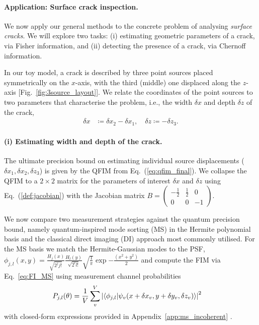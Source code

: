 \documentclass[reprint,amsmath,amssymb,aps,prl,floatfix,groupedaddress,superscriptaddress]{revtex4-2}
\begin{document}
\paragraph{\bfseries Application: Surface crack inspection.\label{sec:3src}}
We now apply our general methods to the concrete problem of analysing {\em surface cracks}. We will explore two tasks: (i) estimating geometric parameters of a crack, via Fisher information, and (ii) detecting the presence of a crack, via Chernoff information.

In our toy model, a crack is described by three point sources placed symmetrically on the $x$-axis, with the third (middle) one displaced along the $z$-axis [Fig.~\ref{fig:3source_layout}]. We relate the coordinates of the point sources to two parameters that characterise the problem, i.e., the width $\delta x$ and depth $\delta z$ of the crack,
\begin{equation}
\begin{aligned}
    \delta x &\coloneqq {\delta x_2 - \delta x_1}, \quad     \delta z \coloneqq -\delta z_3.
\end{aligned}
\label{eq:3pt2paramcoords}
\end{equation}

\paragraph{(i) Estimating width and depth of the crack.}
The ultimate precision bound on estimating individual source displacements (${\delta x_1},{\delta x_2},{\delta z_3}$) is given by the QFIM from Eq.~(\ref{eq:qfim_final}). We collapse the QFIM to a $2 \times 2$ matrix for the parameters of interest $\delta x$ and $\delta z$  using Eq.~(\ref{def:jacobian}) with the Jacobian matrix $B = \left(\begin{smallmatrix}
    -\frac{1}{2} & \frac{1}{2} &  0\\
    0 &  0 & -1
    \end{smallmatrix}\right)$.

We now compare two measurement strategies against the quantum precision bound, namely quantum-inspired mode sorting (MS) in the Hermite polynomial basis and the classical direct imaging (DI) approach most commonly utilised. For the MS basis we match the Hermite-Gaussian modes to the PSF, $\phi_{j,l}(x,y) = \frac{H_j(x)}{\sqrt{2^j j!}} \frac{H_l(y)}{\sqrt{2^l l!}} \sqrt{\frac{1}{\pi}} \exp{-\frac{(x^2 + y^2)}{2}}$ and compute the FIM via Eq.~\eqref{eq:FI_MS} using measurement channel probabilities
\begin{align}
    P_{j,l}(\theta) &= \frac{1}{V} \sum_v^V  \abs{ \braket{\phi_{j,l}}{\psi_v(x + \delta x_v, y + \delta y_v, \delta z_v)} }^2 \label{eq:prob_ms_general}
\end{align}
with closed-form expressions provided in Appendix~\ref{app:ms_incoherent} \cite{supposta}.
\end{document}
